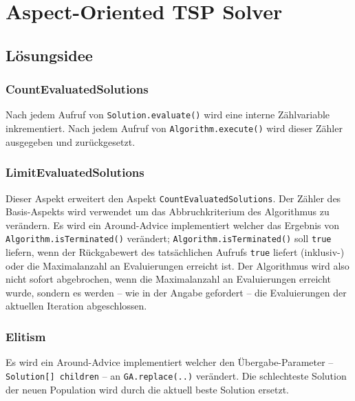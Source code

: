 \documentclass[german,notitlepage,smartquotes]{hgbreport}
\begin{document}

\clearpage

\section{Aspect-Oriented TSP Solver}

\subsection{Lösungsidee}

\subsubsection{CountEvaluatedSolutions}

Nach jedem Aufruf von \texttt{Solution.evaluate()} wird eine interne Zählvariable inkrementiert. Nach jedem Aufruf von \texttt{Algorithm.execute()} wird dieser Zähler ausgegeben und zurückgesetzt.

\subsubsection{LimitEvaluatedSolutions}

Dieser Aspekt erweitert den Aspekt \texttt{CountEvaluatedSolutions}. Der Zähler des Basis-Aspekts wird verwendet um das Abbruchkriterium des Algorithmus zu verändern. Es wird ein Around-Advice implementiert welcher das Ergebnis von \texttt{Algorithm.isTer\-mi\-na\-ted()} verändert; \texttt{Algorithm.isTerminated()} soll \texttt{true} liefern, wenn der Rückgabewert des tatsächlichen Aufrufs \texttt{true} liefert (inklusiv-) oder die Maximalanzahl an Evaluierungen erreicht ist. Der Algorithmus wird also nicht sofort abgebrochen, wenn die Maximalanzahl an Evaluierungen erreicht wurde, sondern es werden -- wie in der Angabe gefordert -- die Evaluierungen der aktuellen Iteration abgeschlossen.

\subsubsection{Elitism}

Es wird ein Around-Advice implementiert welcher den Übergabe-Parameter -- \texttt{Solu\-tion[] children} -- an \texttt{GA.replace(..)} verändert. Die schlechteste Solution der neuen Population wird durch die aktuell beste Solution ersetzt.
\end{document}
